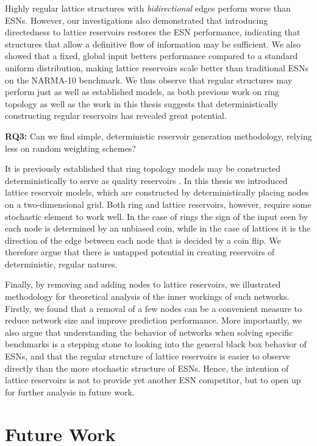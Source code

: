 Highly regular lattice structures with \textit{bidirectional} edges perform
worse than ESNs. However, our investigations also demonstrated that introducing
directedness to lattice reservoirs restores the ESN performance, indicating that
structures that allow a definitive flow of information may be sufficient. We
also showed that a fixed, global input betters performance compared to a
standard uniform distribution, making lattice reservoirs scale better than
traditional ESNs on the NARMA-10 benchmark. We thus observe that regular
structures may perform just as well as established models, as both previous work
on ring topology as well as the work in this thesis suggests that
deterministically constructing regular reservoirs has revealed great potential.

\textbf{RQ3:} Can we find simple, deterministic reservoir generation
methodology, relying less on random weighting schemes?

It is previously established that ring topology models may be constructed
deterministically to serve as quality reservoirs \cite{rodan_minimum_2011}. In
this thesis we introduced lattice reservoir models, which are constructed by
deterministically placing nodes on a two-dimensional grid. Both ring and lattice
reservoirs, however, require some stochastic element to work well. In the case
of rings the sign of the input seen by each node is determined by an unbiased
coin, while in the case of lattices it is the direction of the edge between each
node that is decided by a coin flip. We therefore argue that there is untapped
potential in creating reservoirs of deterministic, regular natures.

Finally, by removing and adding nodes to lattice reservoirs, we illustrated
methodology for theoretical analysis of the inner workings of such
networks. Firstly, we found that a removal of a few nodes can be a convenient
measure to reduce network size and improve prediction performance. More
importantly, we also argue that understanding the behavior of networks when
solving specific benchmarks is a stepping stone to looking into the general
black box behavior of ESNs, and that the regular structure of lattice reservoirs
is easier to observe directly than the more stochastic structure of ESNs. Hence,
the intention of lattice reservoirs is not to provide yet another ESN
competitor, but to open up for further analysis in future work.

\section{Future Work}

